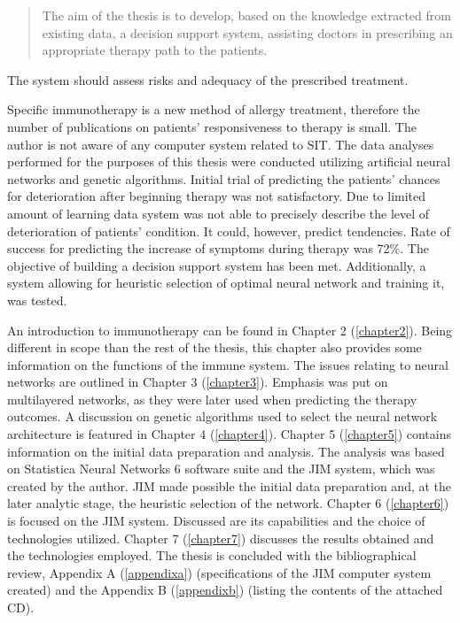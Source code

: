\documentclass[10pt,oneside]{memoir}
\begin{document}
\begin{quotation}
The aim of the thesis is to develop, based on the knowledge extracted from existing data, a decision support system, assisting doctors in prescribing an appropriate  therapy path to the patients.
\end{quotation}

The system should assess risks and adequacy of the prescribed treatment.


Specific immunotherapy is a new method of allergy treatment, therefore the number of publications on patients' responsiveness to therapy is small. The author is not aware of any computer system related to SIT.
The data analyses performed for the purposes of this thesis were conducted utilizing artificial neural networks and genetic algorithms. Initial trial of predicting the patients' chances for deterioration after beginning therapy was not satisfactory. Due to limited amount of learning data system was not able to precisely describe the level of deterioration of patients' condition. It could, however, predict tendencies. Rate of success for predicting the increase of symptoms during therapy was 72\%. The objective of building a decision support system has been met.
Additionally, a system allowing for heuristic selection of optimal neural network and training it, was tested.


An introduction to immunotherapy can be found in Chapter 2 (\autoref{chapter2}). Being different in scope than the rest of the thesis, this chapter also provides some information on the functions of the immune system. The issues relating to neural networks are outlined in Chapter 3 (\autoref{chapter3}). Emphasis was put on multilayered networks, as they were later used when predicting the therapy outcomes. A discussion on genetic algorithms used to select the neural network architecture is featured in Chapter 4 (\autoref{chapter4}). Chapter 5 (\autoref{chapter5}) contains information on the initial data preparation and analysis. The analysis was based on Statistica Neural Networks 6 software suite and the JIM system, which was created by the author. JIM made possible the initial data preparation and, at the later analytic stage, the heuristic selection of the network. Chapter 6 (\autoref{chapter6}) is focused on the JIM system. Discussed are its capabilities and the choice of technologies utilized. Chapter 7 (\autoref{chapter7}) discusses the results obtained and the technologies employed.
The thesis is concluded with the bibliographical review, Appendix A (\autoref{appendixa}) (specifications of the JIM computer system created) and the Appendix B (\autoref{appendixb}) (listing the contents of the attached CD).
\end{document}
